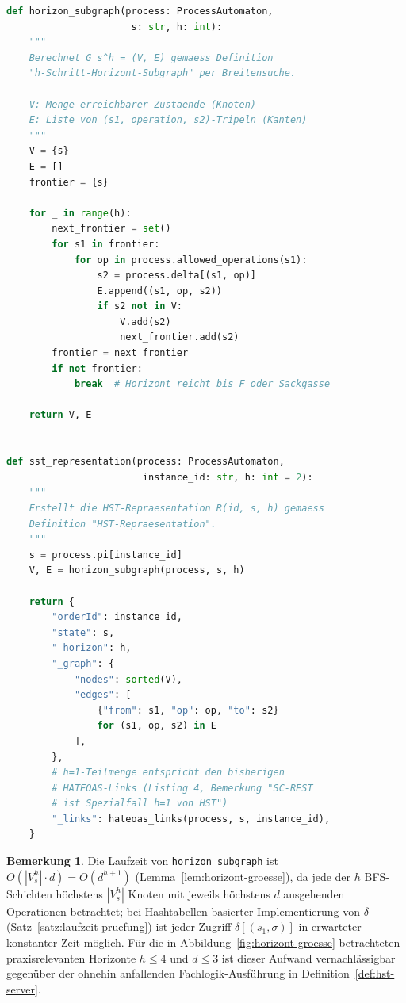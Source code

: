﻿\documentclass[a4paper,12pt]{article}
\theoremstyle{definition}
\newtheorem{bemerkung}{Bemerkung}
\begin{document}
\begin{lstlisting}[language=Python, label=lst:hst-bfs, caption=Breitensuchbasierte Berechnung des Horizont-Subgraphen $G_s^h$ und Einbettung in die HST-Repraesentation]
def horizon_subgraph(process: ProcessAutomaton,
                      s: str, h: int):
    """
    Berechnet G_s^h = (V, E) gemaess Definition
    "h-Schritt-Horizont-Subgraph" per Breitensuche.

    V: Menge erreichbarer Zustaende (Knoten)
    E: Liste von (s1, operation, s2)-Tripeln (Kanten)
    """
    V = {s}
    E = []
    frontier = {s}

    for _ in range(h):
        next_frontier = set()
        for s1 in frontier:
            for op in process.allowed_operations(s1):
                s2 = process.delta[(s1, op)]
                E.append((s1, op, s2))
                if s2 not in V:
                    V.add(s2)
                    next_frontier.add(s2)
        frontier = next_frontier
        if not frontier:
            break  # Horizont reicht bis F oder Sackgasse

    return V, E


def sst_representation(process: ProcessAutomaton,
                        instance_id: str, h: int = 2):
    """
    Erstellt die HST-Repraesentation R(id, s, h) gemaess
    Definition "HST-Repraesentation".
    """
    s = process.pi[instance_id]
    V, E = horizon_subgraph(process, s, h)

    return {
        "orderId": instance_id,
        "state": s,
        "_horizon": h,
        "_graph": {
            "nodes": sorted(V),
            "edges": [
                {"from": s1, "op": op, "to": s2}
                for (s1, op, s2) in E
            ],
        },
        # h=1-Teilmenge entspricht den bisherigen
        # HATEOAS-Links (Listing 4, Bemerkung "SC-REST
        # ist Spezialfall h=1 von HST")
        "_links": hateoas_links(process, s, instance_id),
    }
\end{lstlisting}

\begin{bemerkung}
	Die Laufzeit von \texttt{horizon\_subgraph} ist $O(|V_s^h|\cdot d)= O(d^{h+1})$
	(Lemma~\ref{lem:horizont-groesse}), da jede der $h$ BFS-Schichten höchstens
	$|V_s^h|$ Knoten mit jeweils höchstens $d$ ausgehenden Operationen betrachtet; bei
	Hashtabellen-basierter Implementierung von $\delta$ (Satz~\ref{satz:laufzeit-pruefung})
	ist jeder Zugriff $\delta[(s_1,\sigma)]$ in erwarteter konstanter Zeit möglich. Für
	die in Abbildung~\ref{fig:horizont-groesse} betrachteten praxisrelevanten Horizonte
	$h\le4$ und $d\le3$ ist dieser Aufwand vernachlässigbar gegenüber der ohnehin
	anfallenden Fachlogik-Ausführung in Definition~\ref{def:hst-server}.
\end{bemerkung}
\end{document}
